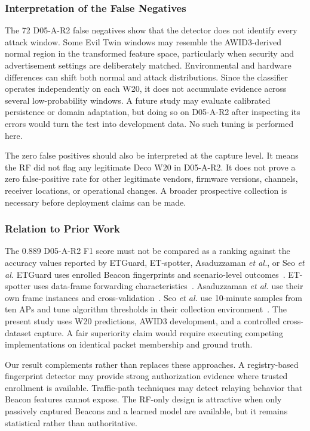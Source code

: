 \documentclass[conference]{IEEEtran}
\begin{document}
\subsubsection{Interpretation of the False Negatives}

The 72 D05-A-R2 false negatives show that the detector does not identify every attack window. Some Evil Twin windows may resemble the AWID3-derived normal region in the transformed feature space, particularly when security and advertisement settings are deliberately matched. Environmental and hardware differences can shift both normal and attack distributions. Since the classifier operates independently on each W20, it does not accumulate evidence across several low-probability windows. A future study may evaluate calibrated persistence or domain adaptation, but doing so on D05-A-R2 after inspecting its errors would turn the test into development data. No such tuning is performed here.

The zero false positives should also be interpreted at the capture level. It means the RF did not flag any legitimate Deco W20 in D05-A-R2. It does not prove a zero false-positive rate for other legitimate vendors, firmware versions, channels, receiver locations, or operational changes. A broader prospective collection is necessary before deployment claims can be made.

\subsubsection{Relation to Prior Work}

The 0.889 D05-A-R2 F1 score must not be compared as a ranking against the accuracy values reported by ETGuard, ET-spotter, Asaduzzaman \emph{et al.}, or Seo \emph{et al.} ETGuard uses enrolled Beacon fingerprints and scenario-level outcomes~\cite{jain2019etguard}. ET-spotter uses data-frame forwarding characteristics~\cite{lu2018etspotter}. Asaduzzaman \emph{et al.} use their own frame instances and cross-validation~\cite{asaduzzaman2020frames}. Seo \emph{et al.} use 10-minute samples from ten APs and tune algorithm thresholds in their collection environment~\cite{seo2020reliability}. The present study uses W20 predictions, AWID3 development, and a controlled cross-dataset capture. A fair superiority claim would require executing competing implementations on identical packet membership and ground truth.

Our result complements rather than replaces these approaches. A registry-based fingerprint detector may provide strong authorization evidence where trusted enrollment is available. Traffic-path techniques may detect relaying behavior that Beacon features cannot expose. The RF-only design is attractive when only passively captured Beacons and a learned model are available, but it remains statistical rather than authoritative.
\end{document}
